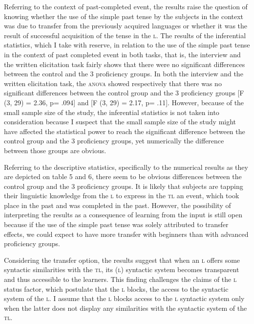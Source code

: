 \documentclass[output=paper,
modfonts
]{langscibook}
\begin{document}
Referring to the context of past-completed event, the results raise the question of knowing whether the use of the simple past tense by the subjects in the context was due to transfer from the previously acquired languages or whether it was the result of successful acquisition of the tense in the \textsc{l}. The results of the inferential statistics, which I take with reserve, in relation to the use of the simple past tense in the context of past completed event in both tasks, that is, the interview and the written elicitation task fairly shows that there were no significant differences between the control and the 3 proficiency groups. In both the interview and the written elicitation task, the \textsc{anova} showed respectively that there was no significant differences between the control group and the 3 proficiency groups [F (3, 29) = 2.36, p= .094] and [F (3, 29) = 2.17, p= .11]. However, because of the small sample size of the study, the inferential statistics is not taken into consideration because I suspect that the small sample size of the study might have affected the statistical power to reach the significant difference between the control group and the 3 proficiency groups, yet numerically the difference between those groups are obvious.

Referring to the descriptive statistics, specifically to the numerical results as they are depicted on table 5 and 6, there seem to be obvious differences between the control group and the 3 proficiency groups. It is likely that subjects are tapping their linguistic knowledge from the \textsc{l} to express in the \textsc{tl} an event, which took place in the past and was completed in the past. However, the possibility of interpreting the results as a consequence of learning from the input is still open because if the use of the simple past tense was solely attributed to transfer effects, we could expect to have more transfer with beginners than with advanced proficiency groups.

Considering the transfer option, the results suggest that when an \textsc{l} offers some syntactic similarities with the \textsc{tl}, its (\textsc{l}) syntactic system becomes transparent and thus accessible to the learners. This finding challenges the claims of the \textsc{l} status factor, which postulate that the \textsc{l} blocks, the access to the syntactic system of the \textsc{l}. I assume that the \textsc{l} blocks access to the \textsc{l} syntactic system only when the latter does not display any similarities with the syntactic system of the \textsc{tl}.
\end{document}
